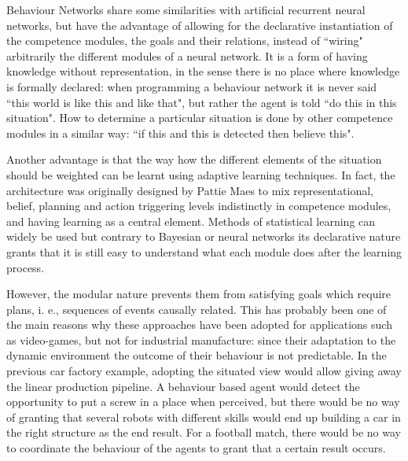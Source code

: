 \documentclass[
		twoside,openright,titlepage,numbers=noenddot,manychapters,
		headinclude,%
                footinclude=false,cleardoublepage=empty,
                BCOR=5mm,
		fontsize=11pt, %
                 enabledeprecatedfontcommands]{scrreprt}
\begin{document}

Behaviour Networks share some similarities with artificial recurrent neural networks, but have the advantage of allowing for the declarative instantiation of the competence modules, the goals and their relations, instead of ``wiring" arbitrarily the different modules of a neural network. It is a form of having knowledge without representation, in the sense there is no place where knowledge is formally declared: when programming a behaviour network it is never said ``this world is like this and like that", but rather the agent is told ``do this in this situation". How to determine a particular situation is done by other competence modules in a similar way: ``if this and this is detected then believe this".

Another advantage is that the way how the different elements of the situation should be weighted can be learnt using adaptive learning techniques. In fact, the architecture was originally designed by Pattie Maes to mix representational, belief, planning and action triggering levels indistinctly in competence modules, and having learning as a central element. Methods of statistical learning can widely be used but contrary to Bayesian or neural networks its declarative nature grants that it is still easy to understand what each module does after the learning process.

However, the modular nature prevents them from satisfying goals which require plans, i. e., sequences of events causally related. This has probably been one of the main reasons why these approaches have been adopted for applications such as video-games, but not for industrial manufacture: since their adaptation to the dynamic environment the outcome of their behaviour is not predictable.  In the previous car factory example, adopting the situated view would allow giving away the linear production pipeline. A behaviour based agent would detect the opportunity to put a screw in a place when perceived, but there would be no way of granting that several robots with different skills would end up building a car in the right structure as the end result. For a football match, there would be no way to coordinate the behaviour of the agents to grant that a certain result occurs.
\end{document}
